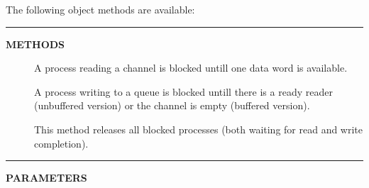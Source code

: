 \documentclass[a4paper,12pt,twoside,english]{article}
\begin{document}
\vskip5pt
The following object methods are available:


\vskip5pt
\vskip5pt\color{highlight-color}
{\rule[-1pt]{2em}{1em}\hskip15pt\bf METHODS

}
\color{black}

\begin{description}
\item[] $ $\\
A process reading a channel is blocked untill one data word is available.

\item[] $ $\\
A process writing to a queue is blocked untill there is a ready reader (unbuffered version) or the channel is empty (buffered version).

\item[] $ $\\
This method releases all blocked processes (both waiting for read and write completion). 


\end{description}
\vskip5pt\color{highlight-color}
{\rule[-1pt]{2em}{1em}\hskip15pt\bf PARAMETERS

}
\color{black}
\end{document}
